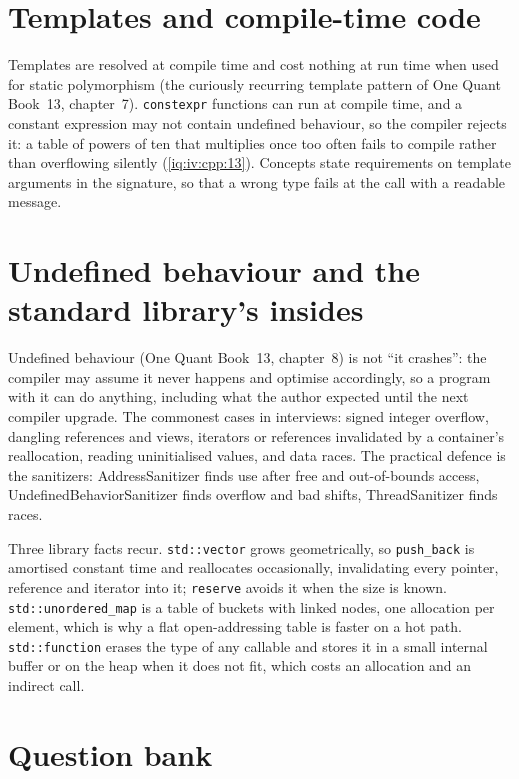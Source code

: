 \section{Templates and compile-time code}

Templates are resolved at compile time and cost nothing at run time when used for static polymorphism (the curiously
recurring template pattern of One Quant Book~13, chapter~7). \texttt{constexpr} functions can run at compile time, and a
constant expression may not contain undefined behaviour, so the compiler rejects it: a table of powers of ten that multiplies
once too often fails to compile rather than overflowing silently (\cref{iq:iv:cpp:13}). Concepts state requirements on
template arguments in the signature, so that a wrong type fails at the call with a readable message.

\section{Undefined behaviour and the standard library's insides}

Undefined behaviour (One Quant Book~13, chapter~8) is not ``it crashes'': the compiler may assume it never happens and
optimise accordingly, so a program with it can do anything, including what the author expected until the next compiler
upgrade. The commonest cases in interviews: signed integer overflow, dangling references and views, iterators or references
invalidated by a container's reallocation, reading uninitialised values, and data races. The practical defence is the
sanitizers: AddressSanitizer finds use after free and out-of-bounds access, UndefinedBehaviorSanitizer finds overflow and
bad shifts, ThreadSanitizer finds races.

Three library facts recur. \texttt{std::vector} grows geometrically, so \texttt{push\_back} is amortised constant time and
reallocates occasionally, invalidating every pointer, reference and iterator into it; \texttt{reserve} avoids it when the size is
known. \texttt{std::unordered\_map} is a table of buckets with linked nodes, one allocation per element, which is why a
flat open-addressing table is faster on a hot path. \texttt{std::function} erases the type of any callable and stores it in a
small internal buffer or on the heap when it does not fit, which costs an allocation and an indirect call.

\section{Question bank}

